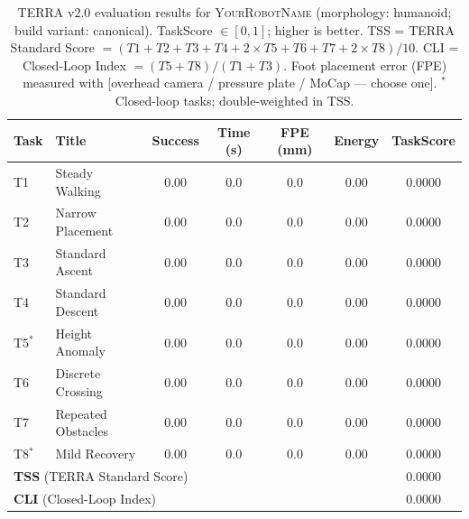 \begin{table}[t]
  \centering
  \caption{%
    TERRA v2.0 evaluation results for \textsc{YourRobotName}
    (morphology: humanoid; build variant: canonical).
    TaskScore $\in [0,1]$; higher is better.
    TSS = TERRA Standard Score $= (T1 + T2 + T3 + T4 + 2{\times}T5 + T6 + T7 + 2{\times}T8)/10$.
    CLI = Closed-Loop Index $= (T5 + T8)/(T1 + T3)$.
    Foot placement error (FPE) measured with [overhead camera / pressure plate / MoCap — choose one].
    $^*$Closed-loop tasks; double-weighted in TSS.
  }
  \label{tab:terra_results}
  \footnotesize
  \begin{tabular}{@{}llccccc@{}}
    \toprule
    \textbf{Task} & \textbf{Title} & \textbf{Success} & \textbf{Time (s)} &
    \textbf{FPE (mm)} & \textbf{Energy} & \textbf{TaskScore} \\
    \midrule
    T1 & Steady Walking        & \num{0.00} & \num{0.0} & \num{0.0} & \num{0.00} & \num{0.0000} \\
    T2 & Narrow Placement      & \num{0.00} & \num{0.0} & \num{0.0} & \num{0.00} & \num{0.0000} \\
    T3 & Standard Ascent       & \num{0.00} & \num{0.0} & \num{0.0} & \num{0.00} & \num{0.0000} \\
    T4 & Standard Descent      & \num{0.00} & \num{0.0} & \num{0.0} & \num{0.00} & \num{0.0000} \\
    T5$^*$ & Height Anomaly    & \num{0.00} & \num{0.0} & \num{0.0} & \num{0.00} & \num{0.0000} \\
    T6 & Discrete Crossing     & \num{0.00} & \num{0.0} & \num{0.0} & \num{0.00} & \num{0.0000} \\
    T7 & Repeated Obstacles    & \num{0.00} & \num{0.0} & \num{0.0} & \num{0.00} & \num{0.0000} \\
    T8$^*$ & Mild Recovery     & \num{0.00} & \num{0.0} & \num{0.0} & \num{0.00} & \num{0.0000} \\
    \midrule
    \multicolumn{6}{l}{\textbf{TSS} (TERRA Standard Score)}  & \num{0.0000} \\
    \multicolumn{6}{l}{\textbf{CLI} (Closed-Loop Index)}     & \num{0.0000} \\
    \bottomrule
  \end{tabular}
\end{table}

